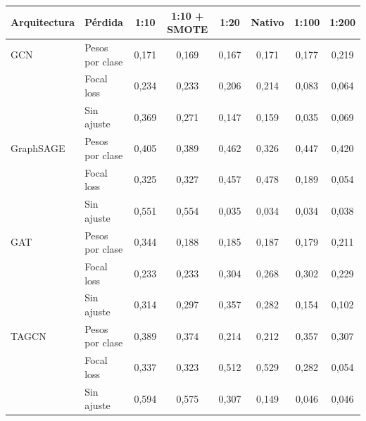\begin{tabular}{llcccccc}
\toprule
Arquitectura & Pérdida & 1:10 & 1:10 + SMOTE & 1:20 & Nativo & 1:100 & 1:200 \\
\midrule
GCN & Pesos por clase & 0{,}171 & 0{,}169 & 0{,}167 & 0{,}171 & 0{,}177 & 0{,}219 \\
 & Focal loss & 0{,}234 & 0{,}233 & 0{,}206 & 0{,}214 & 0{,}083 & 0{,}064 \\
 & Sin ajuste & 0{,}369 & 0{,}271 & 0{,}147 & 0{,}159 & 0{,}035 & 0{,}069 \\
\midrule
GraphSAGE & Pesos por clase & 0{,}405 & 0{,}389 & 0{,}462 & 0{,}326 & 0{,}447 & 0{,}420 \\
 & Focal loss & 0{,}325 & 0{,}327 & 0{,}457 & 0{,}478 & 0{,}189 & 0{,}054 \\
 & Sin ajuste & 0{,}551 & 0{,}554 & 0{,}035 & 0{,}034 & 0{,}034 & 0{,}038 \\
\midrule
GAT & Pesos por clase & 0{,}344 & 0{,}188 & 0{,}185 & 0{,}187 & 0{,}179 & 0{,}211 \\
 & Focal loss & 0{,}233 & 0{,}233 & 0{,}304 & 0{,}268 & 0{,}302 & 0{,}229 \\
 & Sin ajuste & 0{,}314 & 0{,}297 & 0{,}357 & 0{,}282 & 0{,}154 & 0{,}102 \\
\midrule
TAGCN & Pesos por clase & 0{,}389 & 0{,}374 & 0{,}214 & 0{,}212 & 0{,}357 & 0{,}307 \\
 & Focal loss & 0{,}337 & 0{,}323 & 0{,}512 & 0{,}529 & 0{,}282 & 0{,}054 \\
 & Sin ajuste & 0{,}594 & 0{,}575 & 0{,}307 & 0{,}149 & 0{,}046 & 0{,}046 \\
\bottomrule
\end{tabular}
